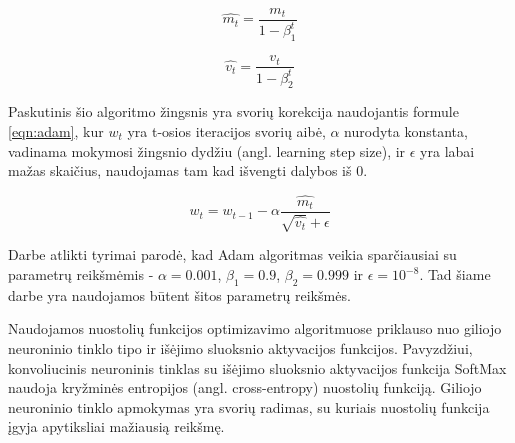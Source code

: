 \begin{equation}
\label{eqn:corr_m_t}
	\hat{m_t} = \dfrac{m_t}{1 - \beta_1^t}
\end{equation}

\begin{equation}
\label{eqn:corr_v_t}
	\hat{v_t} = \dfrac{v_t}{1 - \beta_2^t}
\end{equation}

Paskutinis šio algoritmo žingsnis yra svorių korekcija naudojantis formule \ref{eqn:adam}, kur $w_t$ yra t-osios iteracijos svorių aibė, $\alpha$ nurodyta konstanta, vadinama mokymosi žingsnio dydžiu (angl. learning step size), ir $\epsilon$ yra labai mažas skaičius, naudojamas tam kad išvengti dalybos iš 0.

\begin{equation}
\label{eqn:adam}
	w_t = w_{t-1} - \alpha \dfrac{\hat{m_t}}{\sqrt{\hat{v_t}} + \epsilon}
\end{equation}

Darbe \cite{adam} atlikti tyrimai parodė, kad Adam algoritmas veikia sparčiausiai su parametrų reikšmėmis - $\alpha = 0.001$, $\beta_1 = 0.9$, $\beta_2 = 0.999$ ir $\epsilon = 10^{-8}$. Tad šiame darbe yra naudojamos būtent šitos parametrų reikšmės.

Naudojamos nuostolių funkcijos optimizavimo algoritmuose priklauso nuo giliojo neuroninio tinklo tipo ir išėjimo sluoksnio aktyvacijos funkcijos. Pavyzdžiui, konvoliucinis neuroninis tinklas su išėjimo sluoksnio aktyvacijos funkcija SoftMax naudoja kryžminės entropijos (angl. cross-entropy) nuostolių funkciją. Giliojo neuroninio tinklo apmokymas yra svorių radimas, su kuriais nuostolių funkcija įgyja apytiksliai mažiausią reikšmę.

